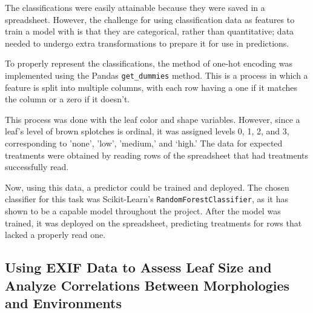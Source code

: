 \documentclass[final,5p,times,twocolumn,authoryear]{elsarticle}
\begin{document}
The classifications were easily attainable because they were saved in a spreadsheet. However, the challenge for using classification data as features to train a model with is that they are categorical, rather than quantitative; data needed to undergo extra transformations to prepare it for use in predictions.

To properly represent the classifications, the method of one-hot encoding \citep{brownlee2020why} was implemented using the Pandas \verb|get_dummies| method. This is a process in which a feature is split into multiple columns, with each row having a one if it matches the column or a zero if it doesn't. 

\begin{center}
\label{Table1}
\end{center}

This process was done with the leaf color and shape variables. However, since a leaf's level of brown splotches is ordinal, it was assigned levels 0, 1, 2, and 3, corresponding to 'none', 'low', 'medium,' and ‘high.' The data for expected treatments were obtained by reading rows of the spreadsheet that had treatments successfully read.

Now, using this data, a predictor could be trained and deployed. The chosen classifier for this task was Scikit-Learn's \verb|RandomForestClassifier|, as it has shown to be a capable model throughout the project. After the model was trained, it was deployed on the spreadsheet, predicting treatments for rows that lacked a properly read one.

\subsection{Using EXIF Data to Assess Leaf Size and Analyze Correlations Between Morphologies and Environments}
\label{step_4}
\end{document}
